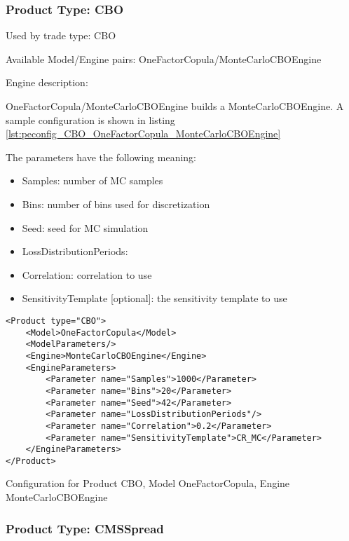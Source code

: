 \subsubsection{Product Type: CBO}

Used by trade type: CBO

Available Model/Engine pairs: OneFactorCopula/MonteCarloCBOEngine

Engine description:

OneFactorCopula/MonteCarloCBOEngine builds a MonteCarloCBOEngine. A sample configuration is shown in listing
\ref{lst:peconfig_CBO_OneFactorCopula_MonteCarloCBOEngine}

The parameters have the following meaning:

\begin{itemize}
\item Samples: number of MC samples
\item Bins: number of bins used for discretization
\item Seed: seed for MC simulation
\item LossDistributionPeriods:
\item Correlation: correlation to use
\item SensitivityTemplate [optional]: the sensitivity template to use   
\end{itemize}

\begin{longlisting}
\begin{verbatim}
<Product type="CBO">
    <Model>OneFactorCopula</Model>
    <ModelParameters/>
    <Engine>MonteCarloCBOEngine</Engine>
    <EngineParameters>
        <Parameter name="Samples">1000</Parameter>
        <Parameter name="Bins">20</Parameter>
        <Parameter name="Seed">42</Parameter>
        <Parameter name="LossDistributionPeriods"/>
        <Parameter name="Correlation">0.2</Parameter>
        <Parameter name="SensitivityTemplate">CR_MC</Parameter>
    </EngineParameters>
</Product>
\end{verbatim}
\caption{Configuration for Product CBO, Model OneFactorCopula, Engine MonteCarloCBOEngine}
\label{lst:peconfig_CBO_OneFactorCopula_MonteCarloCBOEngine}
\end{longlisting}

\subsubsection{Product Type: CMSSpread}

